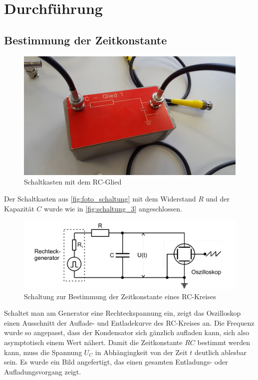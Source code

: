 \section{Durchführung}
\label{sec:Durchführung}
\subsection{Bestimmung der Zeitkonstante}
\label{sec:Durchführung_1}
\begin{figure}
    \centering
    \includegraphics[width=\textwidth/2]{images/foto_schaltung.jpg}
    \caption{Schaltkasten mit dem RC-Glied  \cite{V353}}
    \label{fig:foto_schaltung}
\end{figure}

Der Schaltkasten aus \autoref{fig:foto_schaltung} mit dem Widerstand $R$ und der Kapazität $C$ wurde wie in \autoref{fig:schaltung_3} angeschlossen.

\begin{figure}
    \centering
    \includegraphics[width=\textwidth/2]{images/schaltung_3.png}
    \caption{Schaltung zur Bestimmung der Zeitkonstante eines RC-Kreises  \cite{V353}}
    \label{fig:schaltung_3}
\end{figure}

Schaltet man am Generator eine Rechteckspannung ein, zeigt das Oszilloskop einen Ausschnitt der Auflade- und Entladekurve des RC-Kreises an. Die Frequenz wurde so angepasst, dass der Kondensator sich gänzlich aufladen kann, sich also asymptotisch einem Wert nähert. Damit die Zeitkonstante $RC$ bestimmt werden kann, muss die Spannung $U_C$ in Abhängingkeit von der Zeit $t$ deutlich ablesbar sein. Es wurde ein Bild angefertigt, das einen gesamten Entladungs- oder Aufladungsvorgang zeigt. 

